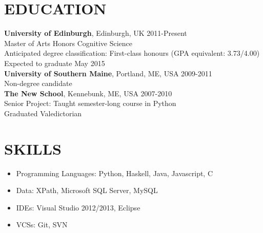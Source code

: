 \documentclass[line, margin]{res}
\newcommand{\CS}{C\nolinebreak\hspace{-.05em}\raisebox{.6ex}{\scriptsize\bf \#}}
\begin{document}
\address{24 Lutton Place, Edinburgh, Scotland EH8 9PE | 001 44 7719 663016 | chase@chasestevens.com}

\begin{resume}
\section{EDUCATION}
\textbf{University of Edinburgh}, Edinburgh, UK \hfill 2011-Present\\
Master of Arts Honors Cognitive Science \\
Anticipated degree classification: First-class honours (GPA equivalent: 3.73/4.00)\\
Expected to graduate May 2015 \\[5pt]
\textbf{University of Southern Maine}, Portland, ME, USA \hfill 2009-2011\\
Non-degree candidate\\[5pt]
\textbf{The New School}, Kennebunk, ME, USA \hfill 2007-2010\\
Senior Project: Taught semester-long course in Python \\
Graduated Valedictorian

\section{SKILLS}
\begin{itemize}[leftmargin=10pt]
\item Programming Languages: Python, Haskell, Java, Javascript, \CS
\item Data: XPath, Microsoft SQL Server, MySQL
\item IDEs: Visual Studio 2012/2013, Eclipse
\item VCSs: Git, SVN
\end{itemize}


\end{resume}
\end{document}
